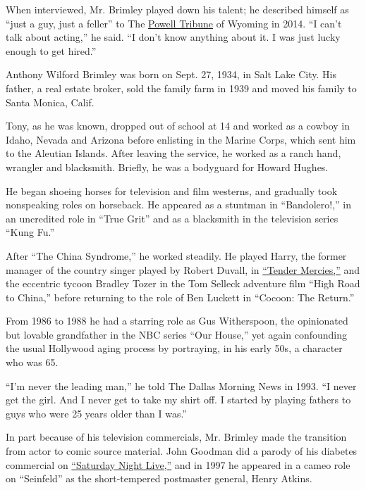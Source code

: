 When interviewed, Mr. Brimley played down his talent; he described
himself as ``just a guy, just a feller'' to The
\href{http://www.powelltribune.com/news/item/12188-\%E2\%80\%98just-a-feller\%E2\%80\%99-actor-wilford-brimley-reflects-on-long-career-stars-he\%E2\%80\%99s-known-and-the-music-he-loves-to-sing}{Powell
Tribune} of Wyoming in 2014. ``I can't talk about acting,'' he said. ``I
don't know anything about it. I was just lucky enough to get hired.''

Anthony Wilford Brimley was born on Sept. 27, 1934, in Salt Lake City.
His father, a real estate broker, sold the family farm in 1939 and moved
his family to Santa Monica, Calif.

Tony, as he was known, dropped out of school at 14 and worked as a
cowboy in Idaho, Nevada and Arizona before enlisting in the Marine
Corps, which sent him to the Aleutian Islands. After leaving the
service, he worked as a ranch hand, wrangler and blacksmith. Briefly, he
was a bodyguard for Howard Hughes.

He began shoeing horses for television and film westerns, and gradually
took nonspeaking roles on horseback. He appeared as a stuntman in
``Bandolero!,'' in an uncredited role in ``True Grit'' and as a
blacksmith in the television series ``Kung Fu.''

After ``The China Syndrome,'' he worked steadily. He played Harry, the
former manager of the country singer played by Robert Duvall, in
\href{https://www.youtube.com/watch?v=d40BjDgpdwU}{``Tender Mercies,''}
and the eccentric tycoon Bradley Tozer in the Tom Selleck adventure film
``High Road to China,'' before returning to the role of Ben Luckett in
``Cocoon: The Return.''

From 1986 to 1988 he had a starring role as Gus Witherspoon, the
opinionated but lovable grandfather in the NBC series ``Our House,'' yet
again confounding the usual Hollywood aging process by portraying, in
his early 50s, a character who was 65.

``I'm never the leading man,'' he told The Dallas Morning News in 1993.
``I never get the girl. And I never get to take my shirt off. I started
by playing fathers to guys who were 25 years older than I was.''

In part because of his television commercials, Mr. Brimley made the
transition from actor to comic source material. John Goodman did a
parody of his diabetes commercial on
\href{https://video.yahoo.com/liberty-medical-000000755.html}{``Saturday
Night Live,''} and in 1997 he appeared in a cameo role on ``Seinfeld''
as the short-tempered postmaster general, Henry Atkins.

